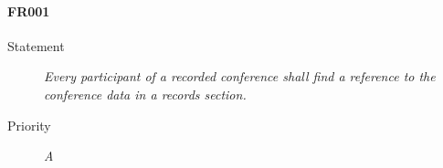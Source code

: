 \paragraph{FR001}
  \begin{description}
  \item [Statement] 
    \textit{ Every participant of a recorded \gls{conference} shall find a reference to the \gls{conference} data in a records section.}
  \item [Priority] \textit{A}
\end{description}